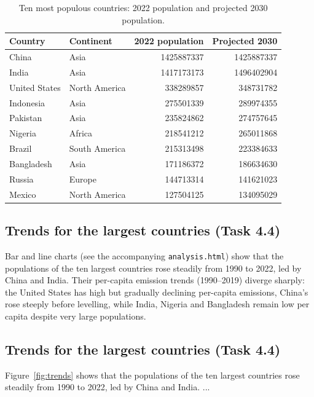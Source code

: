 \documentclass[11pt]{article}
\begin{document}
\begin{table}[h]
\centering
\caption{Ten most populous countries: 2022 population and projected 2030 population.}
\label{tab:top10}
\small
\begin{tabular}{llrr}
\toprule
Country & Continent & 2022 population & Projected 2030 \\
\midrule
China          & Asia          & \num{1425887337} & \num{1425887337} \\
India          & Asia          & \num{1417173173} & \num{1496402904} \\
United States  & North America & \num{338289857}  & \num{348731782}  \\
Indonesia      & Asia          & \num{275501339}  & \num{289974355}  \\
Pakistan       & Asia          & \num{235824862}  & \num{274757645}  \\
Nigeria        & Africa        & \num{218541212}  & \num{265011868}  \\
Brazil         & South America & \num{215313498}  & \num{223384633}  \\
Bangladesh     & Asia          & \num{171186372}  & \num{186634630}  \\
Russia         & Europe        & \num{144713314}  & \num{141621023}  \\
Mexico         & North America & \num{127504125}  & \num{134095029}  \\
\bottomrule
\end{tabular}
\end{table}

\subsection{Trends for the largest countries (Task 4.4)}
Bar and line charts (see the accompanying \texttt{analysis.html}) show that the
populations of the ten largest countries rose steadily from 1990 to 2022, led by
China and India. Their per-capita emission trends (1990--2019) diverge sharply:
the United States has high but gradually declining per-capita emissions, China's
rose steeply before levelling, while India, Nigeria and Bangladesh remain low per
capita despite very large populations.

\subsection{Trends for the largest countries (Task 4.4)}
Figure~\ref{fig:trends} shows that the populations of the ten largest countries
rose steadily from 1990 to 2022, led by China and India. ...
\end{document}
